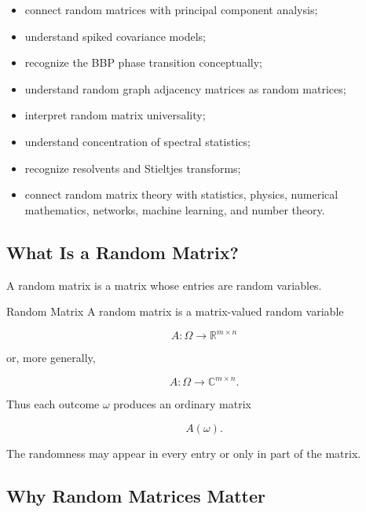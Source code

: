 {\begin{itemize}
    \item connect random matrices with principal component analysis;
    \item understand spiked covariance models;
    \item recognize the BBP phase transition conceptually;
    \item understand random graph adjacency matrices as random matrices;
    \item interpret random matrix universality;
    \item understand concentration of spectral statistics;
    \item recognize resolvents and Stieltjes transforms;
    \item connect random matrix theory with statistics, physics,
          numerical mathematics, networks, machine learning, and number
          theory.
\end{itemize}
}

\subsection{What Is a Random Matrix?}
\label{subsec:what-is-random-matrix}

A random matrix is a matrix whose entries are random variables.

\begin{definitionbox}{Random Matrix}
A random matrix is a matrix-valued random variable

\[
\boxed{
A:\Omega\to\mathbb{R}^{m\times n}
}
\]

or, more generally,

\[
\boxed{
A:\Omega\to\mathbb{C}^{m\times n}.
}
\]
\end{definitionbox}

Thus each outcome \(\omega\) produces an ordinary matrix

\[
A(\omega).
\]

The randomness may appear in every entry or only in part of the matrix.

\subsection{Why Random Matrices Matter}
\label{subsec:why-random-matrices}

